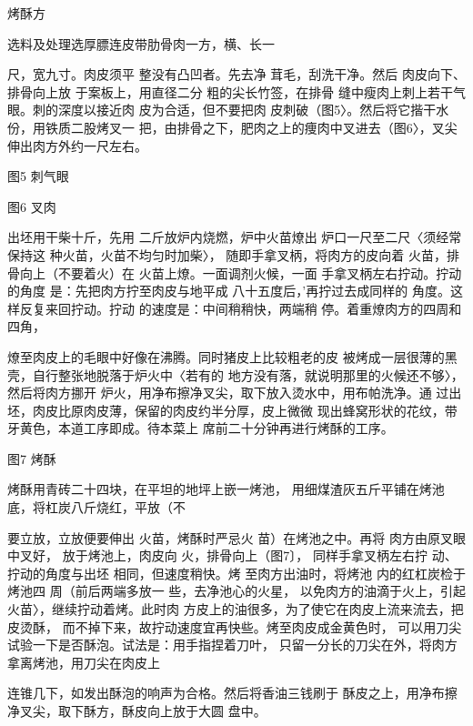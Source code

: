 \begin{recipe}{烤酥方}

\ingredients


\cooking

\step 选料及处理选厚膘连皮带肋骨肉一方，横、长一

尺，宽九寸。肉皮须平 整没有凸凹者。先去净 茸毛，刮洗干净。然后 肉皮向下、排骨向上放 于案板上，用直径二分 粗的尖长竹签，在排骨 缝中瘦肉上刺上若干气 眼。刺的深度以接近肉 皮为合适，但不要把肉 皮刺破（图5〉。然后将它揩干水份，用铁质二股烤叉一 把，由排骨之下，肥肉之上的痩肉中叉进去（图6〉，叉尖 伸出肉方外约一尺左右。

图5 刺气眼

图6 叉肉

\step 出坯用干柴十斤，先用 二斤放炉内烧燃，炉中火苗燎出 炉口一尺至二尺〈须经常保持这 种火苗，火苗不均匀时加柴〉， 随即手拿叉柄，将肉方的皮向着 火苗，排骨向上（不要着火）在 火苗上燎。一面调剂火候，一面 手拿叉柄左右拧动。拧动的角度 是：先把肉方拧至肉皮与地平成 八十五度后，'再拧过去成同样的 角度。这样反复来回拧动。拧动 的速度是：中间稍稍快，两端稍 停。着重燎肉方的四周和四角，

燎至肉皮上的毛眼中好像在沸腾。同时猪皮上比较粗老的皮 被烤成一层很薄的黑壳，自行整张地脱落于炉火中〈若有的 地方没有落，就说明那里的火候还不够〉，然后将肉方挪开 炉火，用净布擦净叉尖，取下放入烫水中，用布帕洗净。通 过出坯，肉皮比原肉皮薄，保留的肉皮约半分厚，皮上微微 现出蜂窝形状的花纹，带牙黄色，本道工序即成。待本菜上 席前二十分钟再进行烤酥的工序。

图7 烤酥

\step 烤酥用青砖二十四块，在平坦的地坪上嵌一烤池， 用细煤渣灰五斤平铺在烤池底，将杠炭八斤烧红，平放（不

要立放，立放便要伸出 火苗，烤酥时严忌火 苗）在烤池之中。再将 肉方由原叉眼中叉好， 放于烤池上，肉皮向 火，排骨向上（图7〕， 同样手拿叉柄左右拧 动、拧动的角度与出坯 相同，但速度稍快。烤 至肉方出油时，将烤池 内的红杠炭检于烤池四 周（前后两端多放一 些，去净池心的火星， 以免肉方的油滴于火上，引起火苗〉，继续拧动着烤。此时肉 方皮上的油很多，为了使它在肉皮上流来流去，把皮烫酥， 而不掉下来，故拧动速度宜再快些。烤至肉皮成金黄色时， 可以用刀尖试验一下是否酥泡。试法是：用手指捏着刀叶， 只留一分长的刀尖在外，将肉方拿离烤池，用刀尖在肉皮上

连锥几下，如发出酥泡的响声为合格。然后将香油三钱刷于 酥皮之上，用净布擦净叉尖，取下酥方，酥皮向上放于大圆 盘中。


\end{recipe}
